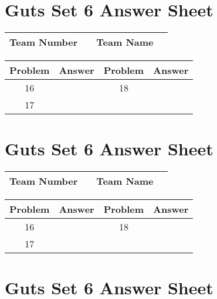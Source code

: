 \documentclass[14pt]{article}
\begin{document}
\section*{Guts Set 6 Answer Sheet}

\begin{center}
\begin{tabular}{|r|r|r|r|}
\hline
	Team Number & \hspace{10em} &
	Team Name & \hspace{15em} \\ \hline
\end{tabular}
\end{center}
\begin{tabularx}{\textwidth}{|c|l|c|X|}\hline
	Problem & Answer & Problem & Answer \\\hline
	16 & \hspace{15em} & 18 & \\\hline
	17 & & & \\\hline
\end{tabularx}

\vspace{30px}

\section*{Guts Set 6 Answer Sheet}

\begin{center}
\begin{tabular}{|r|r|r|r|}
\hline
	Team Number & \hspace{10em} &
	Team Name & \hspace{15em} \\ \hline
\end{tabular}
\end{center}
\begin{tabularx}{\textwidth}{|c|l|c|X|}\hline
	Problem & Answer & Problem & Answer \\\hline
	16 & \hspace{15em} & 18 & \\\hline
	17 & & & \\\hline
\end{tabularx}

\vspace{30px}

\section*{Guts Set 6 Answer Sheet}
\end{document}
